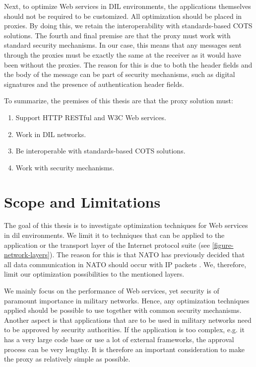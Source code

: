 Next, to optimize Web services in DIL environments, the applications themselves
should not be required to be customized. All optimization should be placed in
proxies. By doing this, we retain the interoperability with standards-based COTS
solutions. The fourth and final premise are that the proxy must work with
standard security mechanisms. In our case, this means that any messages sent
through the proxies must be exactly the same at the receiver as it would have
been without the proxies. The reason for this is due to both the header fields
and the body of the message can be part of security mechanisms, such as digital
signatures and the presence of authentication header fields.

To summarize, the premises of this thesis are that the proxy solution must:

\begin{enumerate}
    \item Support HTTP RESTful and W3C Web services.
    \item Work in DIL networks.
    \item Be interoperable with standards-based COTS solutions.
    \item Work with security mechanisms.
\end{enumerate}

\section{Scope and Limitations}

The goal of this thesis is to investigate optimization techniques for Web
services in \gls{dil} environments. We limit it to techniques that can be
applied to the application or the transport layer of the Internet protocol suite
(see \cref{figure-network-layers}). The reason for this is that NATO has
previously decided that all data communication in NATO should occur with IP
packets \cite{nnec-study}. We, therefore, limit our optimization possibilities to
the mentioned layers.

We mainly focus on the performance of Web services, yet security is of paramount
importance in military networks. Hence, any optimization techniques applied
should be possible to use together with common security mechanisms. Another
aspect is that applications that are to be used in military networks need to be
approved by security authorities. If the application is too complex, e.g. it has
a very large code base or use a lot of external frameworks, the approval process
can be very lengthy. It is therefore an important consideration to make the
proxy as relatively simple as possible.


